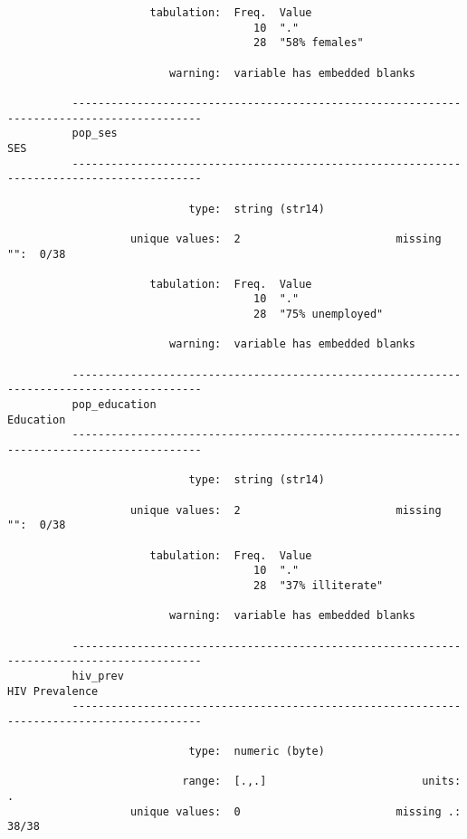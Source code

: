 \documentclass{article}
\begin{document}
\begin{verbatim}
                      tabulation:  Freq.  Value
                                      10  "."
                                      28  "58% females"
          
                         warning:  variable has embedded blanks
          
          ------------------------------------------------------------------------------------------
          pop_ses                                                                                SES
          ------------------------------------------------------------------------------------------
          
                            type:  string (str14)
          
                   unique values:  2                        missing "":  0/38
          
                      tabulation:  Freq.  Value
                                      10  "."
                                      28  "75% unemployed"
          
                         warning:  variable has embedded blanks
          
          ------------------------------------------------------------------------------------------
          pop_education                                                                    Education
          ------------------------------------------------------------------------------------------
          
                            type:  string (str14)
          
                   unique values:  2                        missing "":  0/38
          
                      tabulation:  Freq.  Value
                                      10  "."
                                      28  "37% illiterate"
          
                         warning:  variable has embedded blanks
          
          ------------------------------------------------------------------------------------------
          hiv_prev                                                                    HIV Prevalence
          ------------------------------------------------------------------------------------------
          
                            type:  numeric (byte)
          
                           range:  [.,.]                        units:  .
                   unique values:  0                        missing .:  38/38
          

\end{verbatim}
\end{document}
